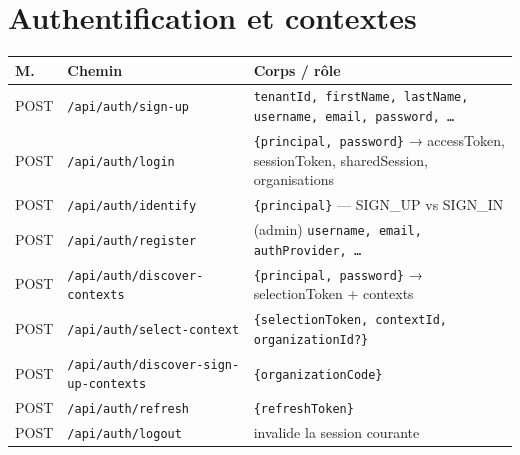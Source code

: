 \documentclass[11pt,a4paper,oneside]{report}
\newcommand{\code}[1]{\texttt{\small #1}}
\begin{document}
\section{Authentification et contextes}
\begin{center}\small
\begin{longtable}{@{}p{1.2cm}p{5.9cm}p{6.2cm}@{}}
\toprule
\textbf{M.} & \textbf{Chemin} & \textbf{Corps / rôle}\\
\midrule\endhead
POST & \code{/api/auth/sign-up} & \code{tenantId, firstName, lastName, username, email, password, \dots}\\
POST & \code{/api/auth/login} & \code{\{principal, password\}} → accessToken, sessionToken, sharedSession, organisations\\
POST & \code{/api/auth/identify} & \code{\{principal\}} — SIGN\_UP vs SIGN\_IN\\
POST & \code{/api/auth/register} & (admin) \code{username, email, authProvider, \dots}\\
POST & \code{/api/auth/discover-contexts} & \code{\{principal, password\}} → selectionToken + contexts\\
POST & \code{/api/auth/select-context} & \code{\{selectionToken, contextId, organizationId?\}}\\
POST & \code{/api/auth/discover-sign-up-contexts} & \code{\{organizationCode\}}\\
POST & \code{/api/auth/refresh} & \code{\{refreshToken\}}\\
POST & \code{/api/auth/logout} & invalide la session courante\\
\bottomrule
\end{longtable}
\end{center}
\end{document}
